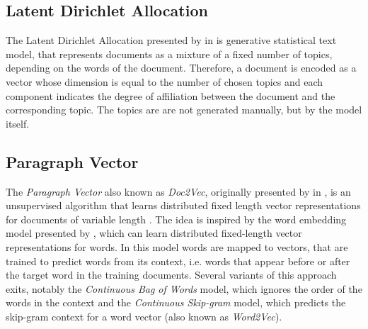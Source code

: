 \subsection{Latent Dirichlet Allocation}

The Latent Dirichlet Allocation presented by \citeauthor{DBLP:journals/jmlr/BleiNJ03} in \citeyear{DBLP:journals/jmlr/BleiNJ03} \cite{DBLP:journals/jmlr/BleiNJ03} is generative statistical text model, that represents documents as a mixture of a fixed number of topics, depending on the words of the document.
Therefore, a document is encoded as a vector whose dimension is equal to the number of chosen topics and each component indicates the degree of affiliation between the document and the corresponding topic.
The topics are are not generated manually, but by the model itself.

\subsection{Paragraph Vector}

The \textit{Paragraph Vector} also known as \textit{Doc2Vec}, originally presented by \citeauthor{DBLP:conf/icml/LeM14} in \citeyear{DBLP:conf/icml/LeM14}, is an unsupervised algorithm that learns distributed fixed length vector representations for documents of variable length \cite{DBLP:conf/icml/LeM14}.
The idea is inspired by the word embedding model presented by \citeauthor{DBLP:journals/jmlr/BengioDVJ03} \cite{DBLP:journals/jmlr/BengioDVJ03}, which can learn distributed fixed-length vector representations for words.
In this model words are mapped to vectors, that are trained to predict words from its context, i.e. words that appear before or after the target word in the training documents.
Several variants of this approach exits, notably the \textit{Continuous Bag of Words} model, which ignores the order of the words in the context and the \textit{Continuous Skip-gram} model, which predicts the skip-gram context for a word vector (also known as \textit{Word2Vec})\cite{DBLP:journals/corr/abs-1301-3781}.

